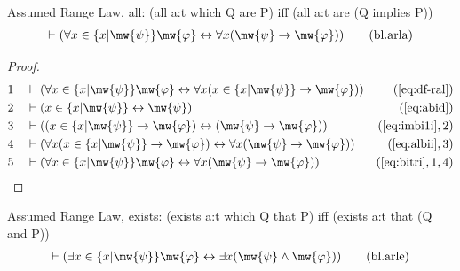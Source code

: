 \begin{lemma} {Assumed Range Law, all}: (all a:t which Q
are P) iff (all a:t are (Q implies P))
\begin{align}
\vdash ( \forall x \in \{ x \vert \mw{\psi} \} \mw{\varphi} \leftrightarrow \forall
    x ( \mw{\psi} \rightarrow \mw{\varphi} ) )\label{eq:bl.arla}\tag{bl.arla}
\end{align}
\end{lemma}

\begin{proof}
\begin{align}
  1 &&  & \vdash ( \forall x \in \{ x \vert \mw{\psi} \} \mw{\varphi}
     \leftrightarrow \forall x ( x \in \{ x \vert \mw{\psi} \}
     \rightarrow \mw{\varphi} )
     )&(\mbox{\ref{eq:df-ral}})\notag
  \\ 2 &&  & \vdash ( x \in \{ x \vert \mw{\psi} \} \leftrightarrow \mw{\psi}
     )&(\mbox{\ref{eq:abid}})\notag
  \\ 3 &&  & \vdash ( ( x \in \{ x \vert \mw{\psi} \} \rightarrow \mw{\varphi} )
     \leftrightarrow ( \mw{\psi} \rightarrow \mw{\varphi}
     ) )&(\mbox{\ref{eq:imbi1i}},2)\notag
  \\ 4 &&  & \vdash ( \forall x ( x \in \{ x \vert \mw{\psi} \} \rightarrow
     \mw{\varphi} ) \leftrightarrow \forall x ( \mw{\psi}
     \rightarrow \mw{\varphi} )
     )&(\mbox{\ref{eq:albii}},3)\notag
  \\ 5 &&  & \vdash ( \forall x \in \{ x \vert \mw{\psi} \} \mw{\varphi}
     \leftrightarrow \forall x ( \mw{\psi} \rightarrow
     \mw{\varphi} ) )&(\mbox{\ref{eq:bitri}},1,4)\notag
\end{align}
\end{proof}

\begin{lemma} {Assumed Range Law, exists}: (exists a:t
which Q that P) iff (exists a:t that (Q and P)) 
\begin{align}
\vdash ( \exists x \in \{ x \vert \mw{\psi} \} \mw{\varphi} \leftrightarrow \exists
    x ( \mw{\psi} \wedge \mw{\varphi} ) )\label{eq:bl.arle}\tag{bl.arle}
\end{align}
\end{lemma}

